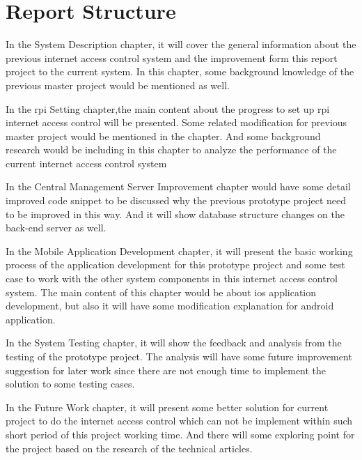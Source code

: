 \section{Report Structure}
\par In the System Description chapter, it will cover the general information about the previous internet access control system and the improvement form this report project to the current system. In this chapter, some background knowledge of the previous master project\cite{TorgeirMR} would be mentioned as well.
\par In the \gls{rpi} Setting chapter,the main content about the progress to set up \gls{rpi} internet access control will be presented. Some related modification for previous master project would be mentioned in the chapter. And some background research would be including in this chapter to analyze the performance of the current internet access control system
\par In the Central Management Server Improvement chapter would have some detail improved code snippet to be discussed why the previous prototype project need to be improved in this way. And it will show database structure changes on the back-end server as well.
\par In the Mobile Application Development chapter, it will present the basic working process of the application development for this prototype project and some test case to work with the other system components in this internet access control system. The main content of this chapter would be about \gls{ios} application development, but also it will have some modification explanation for android application.
\par In the System Testing chapter, it will show the feedback and analysis from the testing of the prototype project. The analysis will have some future improvement suggestion for later work since there are not enough time to implement the solution to some testing cases.
\par In the Future Work chapter, it will present some better solution for current project to do the internet access control which can not be implement within such short period of this project working time. And there will some exploring point for the project based on the research of the technical articles.